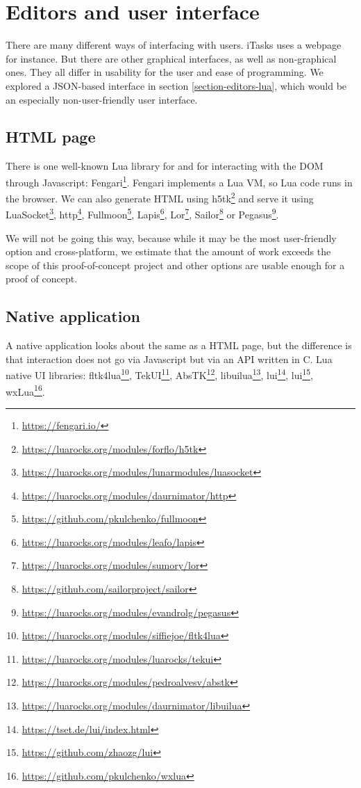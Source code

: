 \section{Editors and user interface}\label{section-editors-ui}
There are many different ways of interfacing with users. iTasks uses a webpage for instance. But there are other graphical interfaces, as well as non-graphical ones. They all differ in usability for the user and ease of programming. We explored a JSON-based interface in section \ref{section-editors-lua}, which would be an especially non-user-friendly user interface.

\subsection{HTML page}
There is one well-known Lua library for and for interacting with the DOM through Javascript: Fengari\footnote{\url{https://fengari.io/}}. Fengari implements a Lua VM, so Lua code runs in the browser. We can also generate HTML using h5tk\footnote{\url{https://luarocks.org/modules/forflo/h5tk}} and serve it using
LuaSocket\footnote{\url{https://luarocks.org/modules/lunarmodules/luasocket}},
http\footnote{\url{https://luarocks.org/modules/daurnimator/http}},
Fullmoon\footnote{\url{https://github.com/pkulchenko/fullmoon}},
Lapis\footnote{\url{https://luarocks.org/modules/leafo/lapis}},
Lor\footnote{\url{https://luarocks.org/modules/sumory/lor}},
Sailor\footnote{\url{https://github.com/sailorproject/sailor}} or
Pegasus\footnote{\url{https://luarocks.org/modules/evandrolg/pegasus}}.

We will not be going this way, because while it may be the most user-friendly option and cross-platform, we estimate that the amount of work exceeds the scope of this proof-of-concept project and other options are usable enough for a proof of concept.

\subsection{Native application}
A native application looks about the same as a HTML page, but the difference is that interaction does not go via Javascript but via an API written in C. Lua native UI libraries:
fltk4lua\footnote{\url{https://luarocks.org/modules/siffiejoe/fltk4lua}},
TekUI\footnote{\url{https://luarocks.org/modules/luarocks/tekui}},
AbsTK\footnote{\url{https://luarocks.org/modules/pedroalvesv/abstk}\label{footnote-abstk}},
libuilua\footnote{\url{https://luarocks.org/modules/daurnimator/libuilua}},
lui\footnote{\url{https://tset.de/lui/index.html}},
lui\footnote{\url{https://github.com/zhaozg/lui}},
wxLua\footnote{\url{https://github.com/pkulchenko/wxlua}}.


